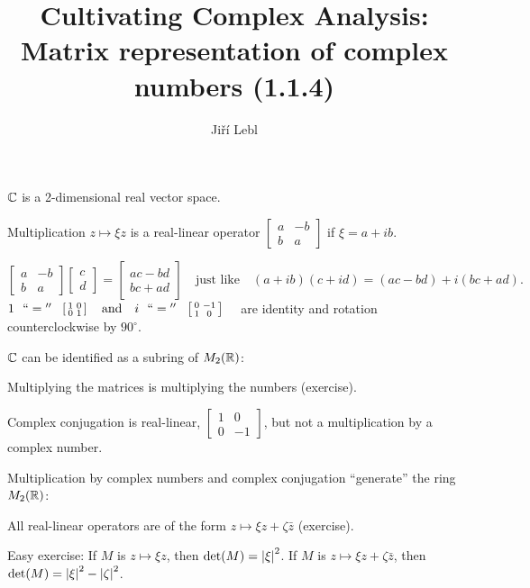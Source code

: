 \documentclass[10pt,aspectratio=169]{beamer}
\author{Ji\v{r}\'i Lebl}
\institute[OSU]{%
Departemento pri Matematiko de Oklahoma {\^S}tata Universitato}
\title{Cultivating Complex Analysis:\\%
Matrix representation of complex numbers (1.1.4)}
\date{}
\begin{document}
\begin{frame}
\titlepage
\end{frame}

\begin{frame}
${\mathbb{C}}$ is a 2-dimensional real vector space.

\pause
\medskip

Multiplication $z \mapsto \xi z$ is a real-linear operator
\(
\left[
\begin{smallmatrix}
a & -b \\
b & a
\end{smallmatrix}
\right]
\) if $\xi = a+ib$.

\pause
\[
\begin{bmatrix}
a & -b \\
b & a
\end{bmatrix}
\begin{bmatrix}
c \\
d 
\end{bmatrix}
=
\begin{bmatrix}
ac-bd \\
bc+ad
\end{bmatrix}
\quad
\text{just like}
\quad
(a+ib)(c+id) = (ac-bd) + i(bc+ad) .
\]
\pause
\medskip
$
1 ~~ ``{}={}'' ~~
\left[
\begin{smallmatrix}
1 & 0 \\
0 & 1
\end{smallmatrix}
\right]
\quad \text{and} \quad
i ~~ ``{}={}'' ~~ \left[
\begin{smallmatrix}
0 & -1 \\
1 & 0
\end{smallmatrix} 
\right]
\quad
$
are identity and rotation counterclockwise by $90^{\circ}$.

\pause
\medskip

${\mathbb{C}}$ can be identified as a subring of $M_2({\mathbb{R}})$:

Multiplying the matrices
is multiplying the numbers (exercise).

\medskip
\pause

Complex conjugation is real-linear,
$\left[ \begin{smallmatrix} 1 & 0 \\ 0 &
-1 \end{smallmatrix} \right]$,
but not a multiplication by a complex number.

\pause
\medskip

Multiplication by complex numbers and complex conjugation ``generate''
the ring $M_2({\mathbb{R}})$:

All real-linear operators are of the form
$z \mapsto \xi z + \zeta \bar{z}$ (exercise).

\pause
\medskip

Easy exercise:
If $M$ is $z \mapsto \xi z$, then $\det(M) = \left\lvert {\xi} \right\rvert^2$.
If $M$ is $z \mapsto \xi z+ \zeta \bar{z}$, then $\det(M) =
\left\lvert {\xi} \right\rvert^2-\left\lvert {\zeta} \right\rvert^2$.

\end{frame}
\end{document}
